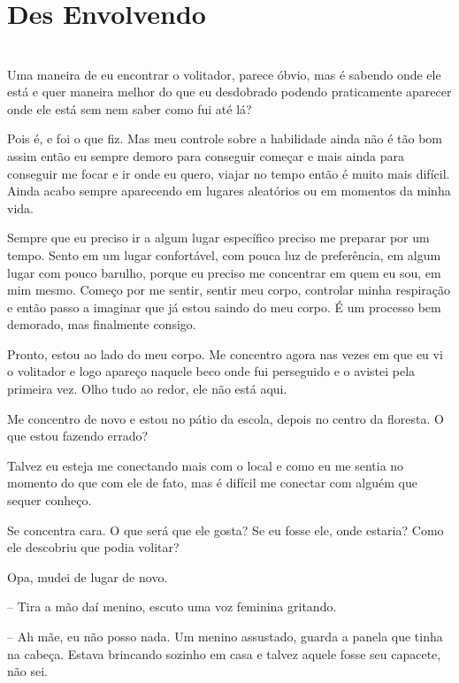 
\newpage


\ifdefined\useChapters
\chapter{Des Envolvendo}
\else
\chapter{}
\fi

Uma maneira de eu encontrar o volitador, parece óbvio, mas é sabendo onde ele está e quer maneira melhor do que eu desdobrado podendo praticamente aparecer onde ele está sem nem saber como fui até lá? 

Pois é, e foi o que fiz. Mas meu controle sobre a habilidade ainda não é tão bom assim então eu sempre demoro para conseguir começar e mais ainda para conseguir me focar e ir onde eu quero, viajar no tempo então é muito mais difícil. Ainda acabo sempre aparecendo em lugares aleatórios ou em momentos da minha vida.

Sempre que eu preciso ir a algum lugar específico preciso me preparar por um tempo. Sento em um lugar confortável, com pouca luz de preferência, em algum lugar com pouco barulho, porque eu preciso me concentrar em quem eu sou, em mim mesmo. Começo por me sentir, sentir meu corpo, controlar minha respiração e então passo a imaginar que já estou saindo do meu corpo. É um processo bem demorado, mas finalmente consigo.

Pronto, estou ao lado do meu corpo. Me concentro agora nas vezes em que eu vi o volitador e logo apareço naquele beco onde fui perseguido e o avistei pela primeira vez. Olho tudo ao redor, ele não está aqui.

Me concentro de novo e estou no pátio da escola, depois no centro da floresta. O que estou fazendo errado?

Talvez eu esteja me conectando mais com o local e como eu me sentia no momento do que com ele de fato, mas é difícil me conectar com alguém que sequer conheço.

Se concentra cara. O que será que ele gosta? Se eu fosse ele, onde estaria? Como ele descobriu que podia volitar?

Opa, mudei de lugar de novo.

-- Tira a mão daí menino, escuto uma voz feminina gritando.

-- Ah mãe, eu não posso nada. Um menino assustado, guarda a panela que tinha na cabeça. Estava brincando sozinho em casa e talvez aquele fosse seu capacete, não sei.

